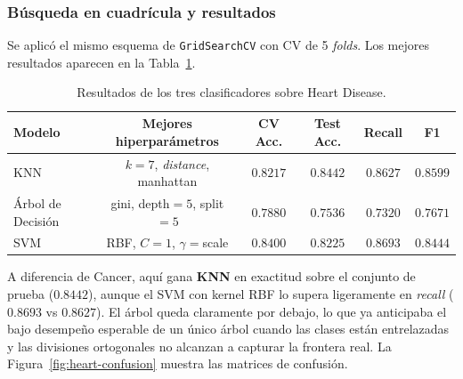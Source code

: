 \subsubsection*{Búsqueda en cuadrícula y resultados}

Se aplicó el mismo esquema de \texttt{GridSearchCV} con CV de 5
\textit{folds}. Los mejores resultados aparecen en la
Tabla~\ref{tab:heart-resultados}.

\begin{table}[H]
    \centering
    \begin{tabular}{lccccc}
        \toprule
        \rowcolor{headerblue}
        \textcolor{headertext}{\textbf{Modelo}}                  &
        \textcolor{headertext}{\textbf{Mejores hiperparámetros}} &
        \textcolor{headertext}{\textbf{CV Acc.}}                 &
        \textcolor{headertext}{\textbf{Test Acc.}}               &
        \textcolor{headertext}{\textbf{Recall}}                  &
        \textcolor{headertext}{\textbf{F1}}                                                                                                                                            \\
        \midrule
        KNN                                                      & $k=7$, \textit{distance}, manhattan & $0.8217$          & $\mathbf{0.8442}$ & $0.8627$          & $\mathbf{0.8599}$ \\
        Árbol de Decisión                                        & gini, depth$=5$, split$=5$          & $0.7880$          & $0.7536$          & $0.7320$          & $0.7671$          \\
        SVM                                                      & RBF, $C=1$, $\gamma=$scale          & $\mathbf{0.8400}$ & $0.8225$          & $\mathbf{0.8693}$ & $0.8444$          \\
        \bottomrule
    \end{tabular}
    \caption{Resultados de los tres clasificadores sobre Heart Disease.}
    \label{tab:heart-resultados}
\end{table}

A diferencia de Cancer, aquí gana \textbf{KNN} en exactitud sobre el
conjunto de prueba ($0.8442$), aunque el SVM con kernel RBF lo supera
ligeramente en \textit{recall} ($0.8693$ vs $0.8627$). El árbol queda
claramente por debajo, lo que ya anticipaba el bajo desempeño esperable
de un único árbol cuando las clases están entrelazadas y las divisiones
ortogonales no alcanzan a capturar la frontera real. La
Figura~\ref{fig:heart-confusion} muestra las matrices de confusión.


